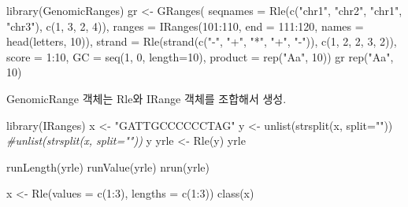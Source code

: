 \documentclass[
]{book}
\newenvironment{Shaded}{\begin{snugshade}}{\end{snugshade}}
\newcommand{\AttributeTok}[1]{\textcolor[rgb]{0.77,0.63,0.00}{#1}}
\newcommand{\CommentTok}[1]{\textcolor[rgb]{0.56,0.35,0.01}{\textit{#1}}}
\newcommand{\DecValTok}[1]{\textcolor[rgb]{0.00,0.00,0.81}{#1}}
\newcommand{\FunctionTok}[1]{\textcolor[rgb]{0.00,0.00,0.00}{#1}}
\newcommand{\NormalTok}[1]{#1}
\newcommand{\OtherTok}[1]{\textcolor[rgb]{0.56,0.35,0.01}{#1}}
\newcommand{\SpecialCharTok}[1]{\textcolor[rgb]{0.00,0.00,0.00}{#1}}
\newcommand{\StringTok}[1]{\textcolor[rgb]{0.31,0.60,0.02}{#1}}
\begin{document}
\begin{Shaded}
\begin{Highlighting}[]
\FunctionTok{library}\NormalTok{(GenomicRanges)}
\NormalTok{gr }\OtherTok{\textless{}{-}} \FunctionTok{GRanges}\NormalTok{(}
    \AttributeTok{seqnames =} \FunctionTok{Rle}\NormalTok{(}\FunctionTok{c}\NormalTok{(}\StringTok{"chr1"}\NormalTok{, }\StringTok{"chr2"}\NormalTok{, }\StringTok{"chr1"}\NormalTok{, }\StringTok{"chr3"}\NormalTok{), }\FunctionTok{c}\NormalTok{(}\DecValTok{1}\NormalTok{, }\DecValTok{3}\NormalTok{, }\DecValTok{2}\NormalTok{, }\DecValTok{4}\NormalTok{)),}
    \AttributeTok{ranges =} \FunctionTok{IRanges}\NormalTok{(}\DecValTok{101}\SpecialCharTok{:}\DecValTok{110}\NormalTok{, }\AttributeTok{end =} \DecValTok{111}\SpecialCharTok{:}\DecValTok{120}\NormalTok{, }\AttributeTok{names =} \FunctionTok{head}\NormalTok{(letters, }\DecValTok{10}\NormalTok{)),}
    \AttributeTok{strand =} \FunctionTok{Rle}\NormalTok{(}\FunctionTok{strand}\NormalTok{(}\FunctionTok{c}\NormalTok{(}\StringTok{"{-}"}\NormalTok{, }\StringTok{"+"}\NormalTok{, }\StringTok{"*"}\NormalTok{, }\StringTok{"+"}\NormalTok{, }\StringTok{"{-}"}\NormalTok{)), }\FunctionTok{c}\NormalTok{(}\DecValTok{1}\NormalTok{, }\DecValTok{2}\NormalTok{, }\DecValTok{2}\NormalTok{, }\DecValTok{3}\NormalTok{, }\DecValTok{2}\NormalTok{)),}
    \AttributeTok{score =} \DecValTok{1}\SpecialCharTok{:}\DecValTok{10}\NormalTok{,}
    \AttributeTok{GC =} \FunctionTok{seq}\NormalTok{(}\DecValTok{1}\NormalTok{, }\DecValTok{0}\NormalTok{, }\AttributeTok{length=}\DecValTok{10}\NormalTok{),}
    \AttributeTok{product =} \FunctionTok{rep}\NormalTok{(}\StringTok{"Aa"}\NormalTok{, }\DecValTok{10}\NormalTok{))}
\NormalTok{gr}
\FunctionTok{rep}\NormalTok{(}\StringTok{"Aa"}\NormalTok{, }\DecValTok{10}\NormalTok{)}
\end{Highlighting}
\end{Shaded}

GenomicRange 객체는 Rle와 IRange 객체를 조합해서 생성.

\begin{Shaded}
\begin{Highlighting}[]
\FunctionTok{library}\NormalTok{(IRanges)}
\NormalTok{x }\OtherTok{\textless{}{-}} \StringTok{"GATTGCCCCCCTAG"}
\NormalTok{y }\OtherTok{\textless{}{-}} \FunctionTok{unlist}\NormalTok{(}\FunctionTok{strsplit}\NormalTok{(x, }\AttributeTok{split=}\StringTok{""}\NormalTok{))}
\CommentTok{\#unlist(strsplit(x, split=""))}
\NormalTok{y}
\NormalTok{yrle }\OtherTok{\textless{}{-}} \FunctionTok{Rle}\NormalTok{(y)}
\NormalTok{yrle}

\FunctionTok{runLength}\NormalTok{(yrle)}
\FunctionTok{runValue}\NormalTok{(yrle)}
\FunctionTok{nrun}\NormalTok{(yrle)}

\NormalTok{x }\OtherTok{\textless{}{-}} \FunctionTok{Rle}\NormalTok{(}\AttributeTok{values =} \FunctionTok{c}\NormalTok{(}\DecValTok{1}\SpecialCharTok{:}\DecValTok{3}\NormalTok{), }\AttributeTok{lengths =} \FunctionTok{c}\NormalTok{(}\DecValTok{1}\SpecialCharTok{:}\DecValTok{3}\NormalTok{))}
\FunctionTok{class}\NormalTok{(x)}
\end{Highlighting}
\end{Shaded}
\end{document}
